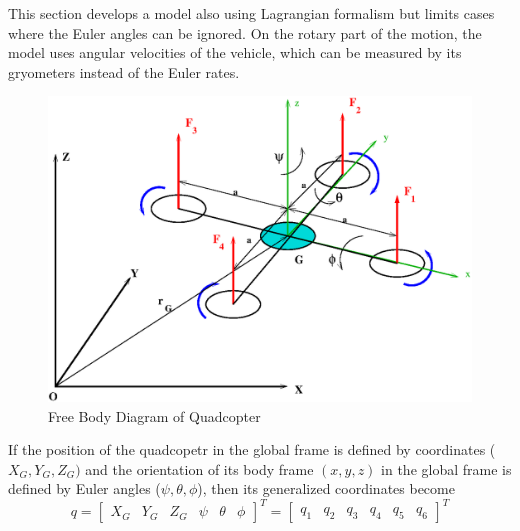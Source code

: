 \documentclass[twocolumn,10pt]{asme2e}
\begin{document}
This section develops a model also using Lagrangian formalism but limits cases where the Euler angles can be ignored. On the rotary part of the motion, the model uses angular velocities of the vehicle, which can be measured by its gryometers instead of  the Euler rates.
\begin{figure}[h]
	\includegraphics[scale = 0.5]{model.eps}
	\caption{Free Body Diagram of Quadcopter}
\end{figure}

If the position of the quadcopetr in the global frame is  defined by coordinates ($X_G, Y_{G}, Z_{G})$ and the orientation of its body frame $(x,y,z)$ in the global frame is  defined by Euler  angles ($\psi,\theta,\phi$), then  its generalized coordinates  become
\begin{equation}
q=[\begin{array}{cccccc}
X_{G} & Y_{G} & Z_{G} & \psi & \theta & \phi\end{array}]^T= [\begin{array}{cccccc}
q_{1} & q_{2} & q_{3} & q_4 & q_5 & q_6\end{array}]^T
\end{equation}
\end{document}
